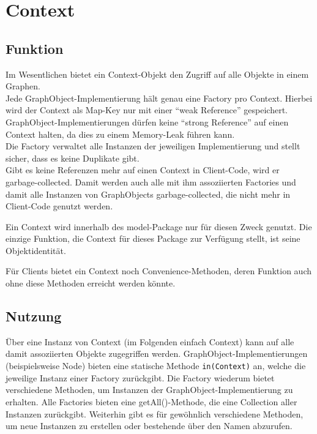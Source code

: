 \documentclass[accentcolor=tud0b,12pt,paper=a4]{tudreport}
\begin{document}
	\section{Context}
		\subsection{Funktion}
			Im Wesentlichen bietet ein Context-Objekt den Zugriff auf alle Objekte in einem Graphen.\\
			Jede GraphObject-Implementierung hält genau eine Factory pro Context. Hierbei wird der Context als Map-Key nur mit einer "`weak Reference"' gespeichert. GraphObject-Implementierungen dürfen keine "`strong Reference"' auf einen Context halten, da dies zu einem Memory-Leak führen kann.\\
			Die Factory verwaltet alle Instanzen der jeweiligen Implementierung und stellt sicher, dass es keine Duplikate gibt.\\
			
			Gibt es keine Referenzen mehr auf einen Context in Client-Code, wird er garbage-collected. Damit werden auch alle mit ihm assoziierten Factories und damit alle Instanzen von GraphObjects garbage-collected, die nicht mehr in Client-Code genutzt werden.
			
			Ein Context wird innerhalb des model-Package nur für diesen Zweck genutzt. Die einzige Funktion, die Context für dieses Package zur Verfügung stellt, ist seine Objektidentität.
			
			Für Clients bietet ein Context noch Convenience-Methoden, deren Funktion auch ohne diese Methoden erreicht werden könnte.			
			
		\subsection{Nutzung}
			Über eine Instanz von Context (im Folgenden einfach Context) kann auf alle damit assoziierten Objekte zugegriffen werden.
			GraphObject-Implementierungen (beispielsweise Node) bieten eine statische Methode \texttt{in(Context)} an, welche die jeweilige Instanz einer Factory zurückgibt. Die Factory wiederum bietet verschiedene Methoden, um Instanzen der GraphObject-Implementierung zu erhalten. Alle Factories bieten eine getAll()-Methode, die eine Collection aller Instanzen zurückgibt. Weiterhin gibt es für gewöhnlich verschiedene Methoden, um neue Instanzen zu erstellen oder bestehende über den Namen abzurufen.\\
			
\end{document}
